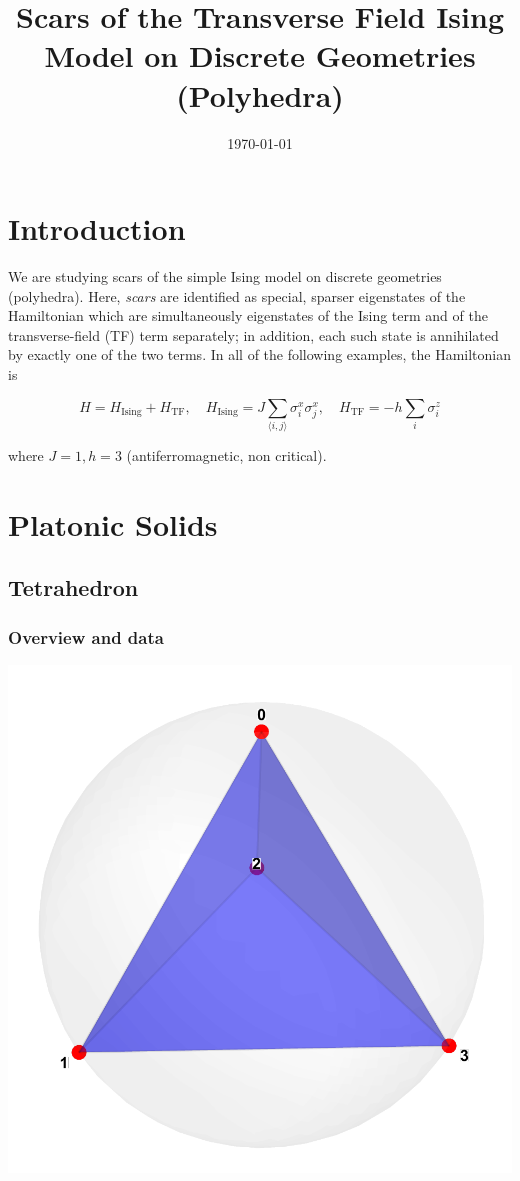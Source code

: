 \documentclass[11pt,a4paper]{article}
\title{Scars of the Transverse Field Ising Model on Discrete Geometries (Polyhedra)}
\author{}
\date{\today}
\newcommand{\Hising}{H_{\mathrm{Ising}}}
\newcommand{\Htf}{H_{\mathrm{TF}}}
\newcommand{\Htot}{H=\Hising+\Htf}
\begin{document}
\maketitle

\section*{Introduction}
We are studying scars of the simple Ising model on discrete geometries (polyhedra). Here, \emph{scars} are identified as special, sparser eigenstates of the Hamiltonian which are simultaneously eigenstates of the Ising term and of the transverse-field (TF) term separately; in addition, each such state is annihilated by exactly one of the two terms. In all of the following examples, the Hamiltonian is

\begin{equation}
\Htot, \quad \Hising = J \sum_{\langle i,j\rangle} \sigma_i^x \sigma_j^x, \quad  \Htf = - h \sum_i \sigma_i^z
\end{equation}

where $J=1, h=3$ (antiferromagnetic, non critical).

\section*{Platonic Solids}

\subsection*{Tetrahedron}

\subsubsection*{Overview and data}
\begin{center}
  \includegraphics[width=.6\linewidth]{tetrahedron}
\end{center}
\end{document}
